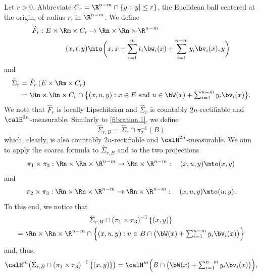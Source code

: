 \begin{Empty}
\label{fibration.2}
Let $r > 0$.
Abbreviate $C_r = \R^{n-m} \cap \left\{ y: |y| \leq r \right\}$, the Euclidean ball centered at the origin, of radius $r$, in $\R^{n-m}$.
We define
\begin{align*}
\hat{F}_r: E \times \Rm \times C_r &\to \Rn \times \Rn \times \R^{n-m}\\
(x,t,y) &\mto \biggl(x, x + \sum_{i=1}^m t_i \bw_i(x) + \sum_{i=1}^{n-m} y_i \bv_i(x), y \biggr)
\end{align*}
and
\begin{align*}
\hat{\Sigma}_r &= \hat{F}_r \left(E \times \Rm \times C_r \right)\\
&= \Rn \times \Rn \times C_r \cap \textstyle\bigl\{ (x,u,y): x \in E \text{ and } u \in \bW(x) + \sum_{i=1}^{n-m} y_i\bv_i(x)\bigr\}.
\end{align*}
We note that $\hat{F}_r$ is locally Lipschitzian and $\hat{\Sigma}_r$ is countably $2n$-rectifiable and $\calH^{2n}$\nobreakdash-measurable.
Similarly to \ref{fibration.1}, we define
\begin{equation*}
\hat{\Sigma}_{r,B} = \hat{\Sigma}_r \cap \pi_2^{-1}(B)
\end{equation*}
which, clearly, is also countably $2n$-rectifiable and $\calH^{2n}$-measurable.
We aim to apply the coarea formula to $\hat{\Sigma}_{r,B}$ and to the two projections
\begin{equation*}
\pi_1 \times \pi_3: \Rn \times \Rn \times \R^{n-m} \to \Rn \times \R^{n-m}:\quad (x,u,y) \mto (x,y)
\end{equation*}
and
\begin{equation*}
\pi_2 \times \pi_3: \Rn \times \Rn \times \R^{n-m} \to \Rn \times \R^{n-m}:\quad (x,u,y) \mto (u,y).
\end{equation*}
To this end, we notice that
\begin{multline*}
\hat{\Sigma}_{r,B} \cap \left(\pi_1 \times \pi_3 \right)^{-1} \{ (x,y) \} \\ = \textstyle\Rn \times \Rn \times \R^{n-m} \cap \Bigl\{ (x,u,y): u \in B \cap \bigl(\bW(x) + \sum_{i=1}^{n-m} y_i \bv_i(x) \bigr)\Bigr\}
\end{multline*}
and, thus,
\begin{equation*}
\calH^m \bigl(\hat{\Sigma}_{r,B} \cap \left(\pi_1 \times \pi_3 \right)^{-1} \{ (x,y) \}\bigr) = \textstyle\calH^m \Bigl(B \cap \bigl(\bW(x) + \sum_{i=1}^{n-m} y_i \bv_i(x) \bigr) \Bigr),
\end{equation*}

\end{Empty}
